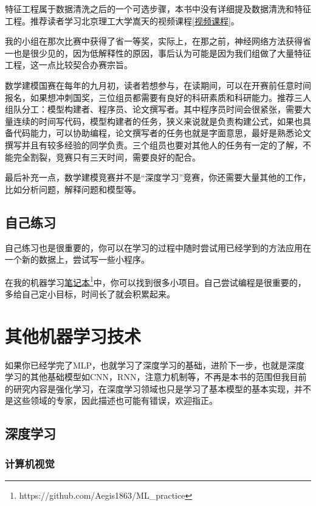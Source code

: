 \documentclass[a5paper, 11pt, openany]{book}
\begin{document}
特征工程属于数据清洗之后的一个可选步骤，本书中没有详细提及数据清洗和特征工程。推荐读者学习北京理工大学嵩天的视频课程\ref{视频课程}。

我的小组在那次比赛中获得了省一等奖，实际上，在那之前，神经网络方法获得省一也是很少见的，因为低解释性的原因，事后认为可能是因为我们组做了大量特征工程，这一点比较契合办赛宗旨。

数学建模国赛在每年的九月初，读者若想参与，在读期间，可以在开赛前任意时间报名，如果想冲刺国奖，三位组员都需要有良好的科研素质和科研能力。推荐三人组队分工：模型构建者、程序员、论文撰写者。其中程序员时间会很紧张，需要大量连续的时间写代码，模型构建者的任务，狭义来说就是负责构建公式，如果也具备代码能力，可以协助编程，论文撰写者的任务也就是字面意思，最好是熟悉论文撰写并且有较多经验的同学负责。三个组员也要对其他人的任务有一定的了解，不能完全割裂，竞赛只有三天时间，需要良好的配合。

最后补充一点，数学建模竞赛并不是“深度学习”竞赛，你还需要大量其他的工作，比如分析问题，解释问题和模型等。

\section{自己练习}

自己练习也是很重要的，你可以在学习的过程中随时尝试用已经学到的方法应用在一个新的数据上，尝试写一些小程序。

在我的机器学习\href{https://github.com/Aegis1863/ML\_practice}{笔记本}\footnote{https://github.com/Aegis1863/ML\_practice}中，你可以找到很多小项目。自己尝试编程是很重要的，多给自己定小目标，时间长了就会积累起来。


\chapter{其他机器学习技术}

如果你已经学完了MLP，也就学习了深度学习的基础，进阶下一步，也就是深度学习的其他基础模型如CNN，RNN，注意力机制等，不再是本书的范围但我目前的研究内容是强化学习，在深度学习领域也只是学习了基本模型的基本实现，并不是这些领域的专家，因此描述也可能有错误，欢迎指正。

\section{深度学习}

\subsection{计算机视觉}
\end{document}
